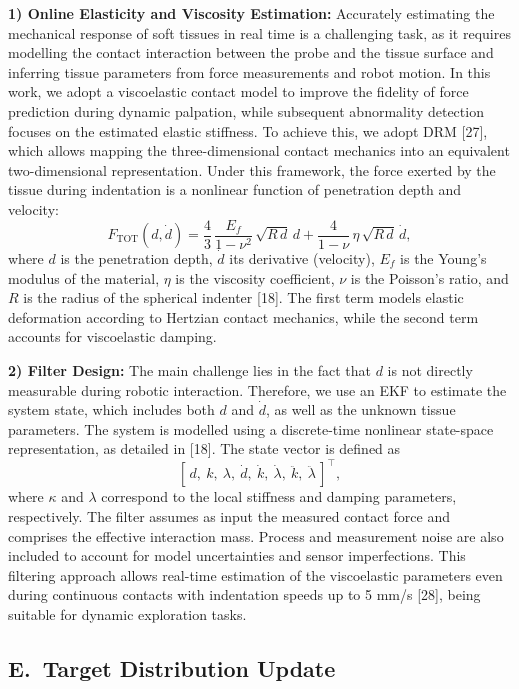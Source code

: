 \documentclass[11pt]{article}
\begin{document}
\textbf{1) Online Elasticity and Viscosity Estimation:} Accurately
estimating the mechanical response of soft tissues in real time is a
challenging task, as it requires modelling the contact interaction
between the probe and the tissue surface and inferring tissue
parameters from force measurements and robot motion. In this work,
we adopt a viscoelastic contact model to improve the fidelity of
force prediction during dynamic palpation, while subsequent
abnormality detection focuses on the estimated elastic stiffness.
To achieve this, we adopt DRM [27], which allows mapping the
three-dimensional contact mechanics into an equivalent
two-dimensional representation. Under this framework, the force
exerted by the tissue during indentation is a nonlinear function of
penetration depth and velocity:
\begin{equation}
F_{\mathrm{TOT}}(d, \dot{d}) =
\frac{4}{3}\, \frac{E_{f}}{1 - \nu^{2}}\, \sqrt{R\, d}\, d
+ \frac{4}{1 - \nu}\, \eta\, \sqrt{R\, d}\, \dot{d},
\end{equation}
where $d$ is the penetration depth, $\dot{d}$ its derivative
(velocity), $E_{f}$ is the Young's modulus of the material, $\eta$
is the viscosity coefficient, $\nu$ is the Poisson's ratio, and $R$
is the radius of the spherical indenter [18]. The first term models
elastic deformation according to Hertzian contact mechanics, while
the second term accounts for viscoelastic damping.

\textbf{2) Filter Design:} The main challenge lies in the fact that
$d$ is not directly measurable during robotic interaction. Therefore,
we use an EKF to estimate the system state, which includes both $d$
and $\dot{d}$, as well as the unknown tissue parameters. The system
is modelled using a discrete-time nonlinear state-space
representation, as detailed in [18]. The state vector is defined as
\[
[\,d,\ k,\ \lambda,\ \dot{d},\ \dot{k},\ \dot{\lambda},\ \ddot{k},\
\ddot{\lambda}\,]^{\top},
\]
where $\kappa$ and $\lambda$ correspond to the local stiffness and
damping parameters, respectively. The filter assumes as input the
measured contact force and comprises the effective interaction mass.
Process and measurement noise are also included to account for model
uncertainties and sensor imperfections. This filtering approach
allows real-time estimation of the viscoelastic parameters even
during continuous contacts with indentation speeds up to 5 mm/s
[28], being suitable for dynamic exploration tasks.

\subsection*{E.\ Target Distribution Update}
\end{document}
